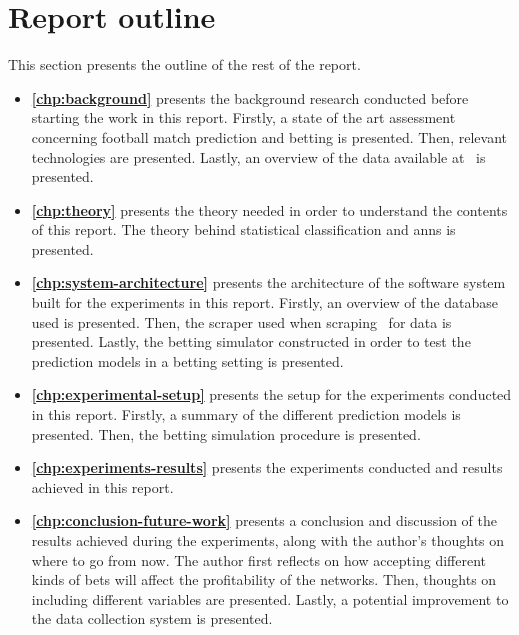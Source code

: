 \section{Report outline}

This section presents the outline of the rest of the report.

\begin{itemize}
    \item \textbf{\cref{chp:background}} presents the background research conducted before starting the work in this report. Firstly, a state of the art assessment concerning football match prediction and betting is presented. Then, relevant technologies are presented. Lastly, an overview of the data available at \whoscored\ is presented.
        
    \item \textbf{\cref{chp:theory}} presents the theory needed in order to understand the contents of this report. The theory behind statistical classification and \glspl{ann} is presented. 

    \item \textbf{\cref{chp:system-architecture}} presents the architecture of the software system built for the experiments in this report. Firstly, an overview of the database used is presented. Then, the scraper used when scraping \whoscored\ for data is presented. Lastly, the betting simulator constructed in order to test the prediction models in a betting setting is presented.

    \item \textbf{\cref{chp:experimental-setup}} presents the setup for the experiments conducted in this report. Firstly, a summary of the different prediction models is presented. Then, the betting simulation procedure is presented.

    \item \textbf{\cref{chp:experiments-results}} presents the experiments conducted and results achieved in this report.

    \item \textbf{\cref{chp:conclusion-future-work}} presents a conclusion and discussion of the results achieved during the experiments, along with the author's thoughts on where to go from now. The author first reflects on how accepting different kinds of bets will affect the profitability of the networks. Then, thoughts on including different variables are presented. Lastly, a potential improvement to the data collection system is presented.
\end{itemize}